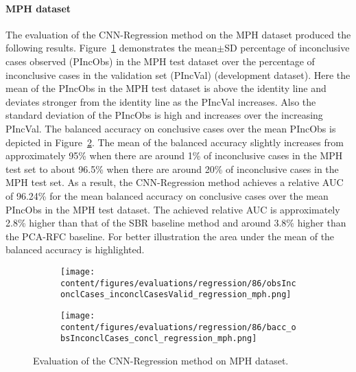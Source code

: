 
\paragraph{MPH dataset}

The evaluation of the CNN-Regression method on the MPH dataset produced the following results.
Figure~\ref{fig:obsInconclCases_inconclCasesValid_regression_mph} demonstrates
the mean$\pm$SD percentage of inconclusive cases observed (PIncObs) in the MPH test dataset 
over the percentage of inconclusive cases in the validation set (PIncVal) (development dataset).
Here the mean of the PIncObs in the MPH test dataset is above the identity line 
and deviates stronger from the identity line as the PIncVal increases.
Also the standard deviation of the PIncObs is high and increases over the increasing PIncVal.
The balanced accuracy on conclusive cases over the mean PIncObs 
is depicted in Figure~\ref{fig:bacc_obsInconclCases_concl_regression_mph}.
The mean of the balanced accuracy slightly increases from approximately 95\% 
when there are around 1\% of inconclusive cases in the MPH test set to about 96.5\% 
when there are around 20\% of inconclusive cases in the MPH test set.
As a result, the CNN-Regression method achieves a relative AUC of 96.24\% for the mean balanced accuracy on conclusive cases 
over the mean PIncObs in the MPH test dataset.
The achieved relative AUC is approximately 2.8\% higher than that of the SBR baseline method 
and around 3.8\% higher than the PCA-RFC baseline.
For better illustration the area under the mean of the balanced accuracy is highlighted.


\begin{figure}[ht]
  \begin{subfigure}{0.9\textwidth}
    \centering
    \texttt{[image: content/figures/evaluations/regression/86/obsInconclCases\_inconclCasesValid\_regression\_mph.png]}
    \label{fig:obsInconclCases_inconclCasesValid_regression_mph}
  \end{subfigure}
  \hfill
  \begin{subfigure}{0.9\textwidth}
    \centering
    \texttt{[image: content/figures/evaluations/regression/86/bacc\_obsInconclCases\_concl\_regression\_mph.png]}
    \label{fig:bacc_obsInconclCases_concl_regression_mph}
  \end{subfigure}
  \caption{Evaluation of the CNN-Regression method on MPH dataset.}
  \label{fig:perf_regression_mph}
\end{figure}


